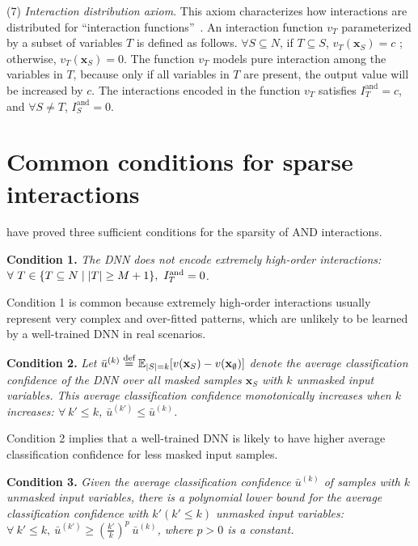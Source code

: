 \documentclass[10pt,twocolumn,letterpaper]{article}
\begin{document}
(7) \textit{Interaction distribution axiom}. This axiom characterizes how interactions are distributed for ``interaction functions''~\cite{sundararajan2020shapley}. An interaction function {\small $v_T$} parameterized by a subset of variables {\small $T$} is defined as follows. {\small $\forall S\subseteq N$}, if {\small $T\subseteq S$}, {\small$v_T(\mathbf{x}_S)=c$} ; otherwise, {\small $v_T(\mathbf{x}_S)=0$}. The function {\small$v_T$} models pure interaction among the variables in {\small$T$}, because only if all variables in {\small$T$} are present, the output value will be increased by {\small$c$}. The interactions encoded in the function {\small$v_T$} satisfies {\small $I^{\text{and}}_T=c$}, and {\small $\forall S\neq T$}, {\small $I^{\text{and}}_S=0$}.




\section{Common conditions for sparse interactions}
\label{sec:apdx-condition-for-sparsity}

\citet{ren2024we} have proved three sufficient conditions for the sparsity of AND interactions.

\textbf{Condition 1.} \textit{The DNN does not encode extremely high-order interactions: {\small$\forall \ T\in \{T\subseteq N \mid \vert T\vert \ge M+1\}, \ I^{\text{\rm and}}_T =0$}.}

Condition 1 is common because extremely high-order interactions usually represent very complex and over-fitted patterns, which are unlikely to be learned by a well-trained DNN in real scenarios.

\textbf{Condition 2.} \textit{Let {\small$\bar{u}^{(k)}\overset{\text{\rm def}}{=}\mathbb{E}_{|S|=k}[v(\mathbf{x}_S)-v(\mathbf{x}_\emptyset)]$} denote the average classification confidence of the DNN over all masked samples $\mathbf{x}_S$ with $k$ unmasked input variables. This average classification confidence monotonically increases when $k$ increases: $\forall \ k' \le k$, {\small$\bar{u}^{(k')} \le \bar{u}^{(k)}$}.}

Condition 2 implies that a well-trained DNN is likely to have higher average classification confidence for less masked input samples.

\textbf{Condition 3.} \textit{Given the average classification confidence $\bar{u}^{(k)}$ of samples with $k$ unmasked input variables, there is a polynomial lower bound for the average classification confidence with $k' (k'\le k)$ unmasked input variables: {\small $\forall \ k' \le k, \ \bar{u}^{(k')} \ge (\frac{k'}{k})^p \ \bar{u}^{(k)}$}, where $p>0$ is a constant.}
\end{document}

